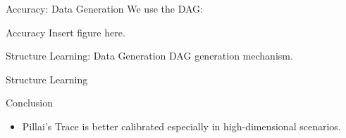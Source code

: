 \documentclass{beamer}
\begin{document}
\begin{frame}{Accuracy: Data Generation}
	We use the DAG:
\end{frame}

\begin{frame}{Accuracy}
	Insert figure here.
\end{frame}

\begin{frame}{Structure Learning: Data Generation}
	DAG generation mechanism.
\end{frame}

\begin{frame}{Structure Learning}
\end{frame}

\begin{frame}{Conclusion}
	\begin{itemize}
		\item Pillai's Trace is better calibrated especially in high-dimensional scenarios.
	\end{itemize}
\end{frame}
\end{document}
